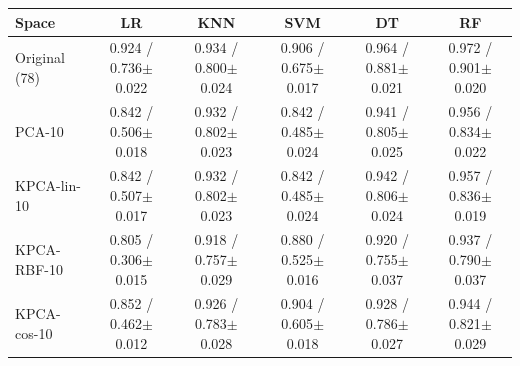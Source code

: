 \begin{tabular}{lccccc}
\toprule
Space & LR & KNN & SVM & DT & RF \\
\midrule
Original (78) & 0.924 / 0.736$\pm$0.022 & 0.934 / 0.800$\pm$0.024 & 0.906 / 0.675$\pm$0.017 & 0.964 / 0.881$\pm$0.021 & 0.972 / 0.901$\pm$0.020 \\
PCA-10 & 0.842 / 0.506$\pm$0.018 & 0.932 / 0.802$\pm$0.023 & 0.842 / 0.485$\pm$0.024 & 0.941 / 0.805$\pm$0.025 & 0.956 / 0.834$\pm$0.022 \\
KPCA-lin-10 & 0.842 / 0.507$\pm$0.017 & 0.932 / 0.802$\pm$0.023 & 0.842 / 0.485$\pm$0.024 & 0.942 / 0.806$\pm$0.024 & 0.957 / 0.836$\pm$0.019 \\
KPCA-RBF-10 & 0.805 / 0.306$\pm$0.015 & 0.918 / 0.757$\pm$0.029 & 0.880 / 0.525$\pm$0.016 & 0.920 / 0.755$\pm$0.037 & 0.937 / 0.790$\pm$0.037 \\
KPCA-cos-10 & 0.852 / 0.462$\pm$0.012 & 0.926 / 0.783$\pm$0.028 & 0.904 / 0.605$\pm$0.018 & 0.928 / 0.786$\pm$0.027 & 0.944 / 0.821$\pm$0.029 \\
\bottomrule
\end{tabular}
